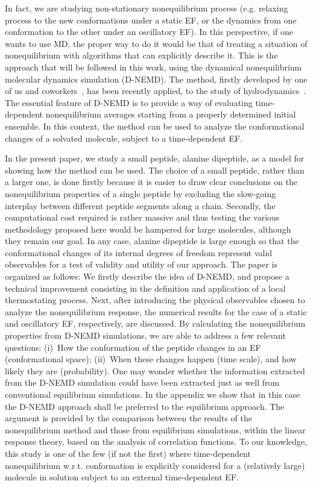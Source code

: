 \documentclass[a4paper,preprint,unsortedaddress,onecolumn]{revtex4-1}
\newcommand{\recheck}[1]{{\color{red} #1}}
\begin{document}
In fact, we are studying non-stationary nonequilibrium process
(e.g. relaxing process to the new conformations under a static
EF, or the dynamics from one conformation to the other under an oscillatory EF).
In this perspective, if one wants to use MD, the proper way to do it would be that of treating a situation of nonequilibrium with algorithms that can explicitly describe it.
This is the approach that will be followed in this work, using
the dynamical nonequilibrium molecular dynamics simulation (D-NEMD).
The method, firstly developed by one of us and coworkers~\cite{ciccotti1975direct, ciccotti1979thought, ciccotti1993theoretical, palla2008bulk}, 
has been recently applied, to the study of
hydrodynamics~\cite{orlandini2011hydrodynamics,
  orlandini2011hydrodynamics-01}. The essential feature of D-NEMD is to
provide a way of evaluating time-dependent
nonequilibrium averages starting from a properly determined initial ensemble.
In this context, the method can be used to analyze the
conformational changes of a solvated molecule, subject to a time-dependent EF.

In the present paper, we study a small peptide, alanine dipeptide, as a model for showing how the method can be used. 
The choice of a small peptide, rather than a larger one, is done firstly because it
is easier to draw clear conclusions on the nonequilibrium properties
of a single peptide by excluding the slow-going interplay between
different peptide segments along a chain. 
Secondly, the computational cost required is rather massive and thus  testing
the various methodology proposed here would be hampered for large molecules,
although they remain our goal.  In any case, alanine dipeptide
is large enough so that the conformational changes of its internal degrees of freedom represent valid observables for a test of validity and utility of our approach.
The paper is organized as follows:
  We firstly describe the idea of D-NEMD, and propose a technical improvement consisting in the definition and application of a local thermostating process.
Next, after introducing the physical
observables chosen to analyze the nonequilibrium response,
the numerical results for the case of a static and oscillatory EF, respectively, are discussed. By calculating the nonequilibrium properties from D-NEMD
simulations, we are able to address
a few relevant questions: (i)~How the conformation of the peptide
changes in an EF (conformational space);
(ii)~When these changes happen (time scale),
and how likely they are (probability).
\recheck{One may wonder whether the information extracted from the D-NEMD simulation could have been
extracted just as well from conventional equilibrium simulations.
  In the appendix we show that in this case the D-NEMD approach shall be preferred to the equilibrium approach. The argument is provided by the comparison between the results of the nonequilibrium method and
  those from equilibrium simulations, within the linear response theory, based on the analysis of correlation functions.}
To our knowledge, this study is one of the few (if not the first)  where
time-dependent nonequilibrium w.r.t. conformation
is explicitly considered for a (relatively large) molecule
in solution subject to an external time-dependent EF.
\end{document}
